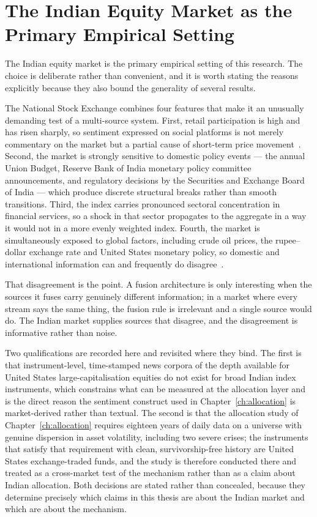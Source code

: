 \section{The Indian Equity Market as the Primary Empirical Setting}

The Indian equity market is the primary empirical setting of this research. The choice is
deliberate rather than convenient, and it is worth stating the reasons explicitly because
they also bound the generality of several results.

The National Stock Exchange combines four features that make it an unusually demanding test
of a multi-source system. First, retail participation is high and has risen sharply, so
sentiment expressed on social platforms is not merely commentary on the market but a
partial cause of short-term price movement~\cite{khan2025asymmetric,mu2023investor}. Second,
the market is strongly sensitive to domestic policy events --- the annual Union Budget,
Reserve Bank of India monetary policy committee announcements, and regulatory decisions by
the Securities and Exchange Board of India --- which produce discrete structural breaks
rather than smooth transitions. Third, the index carries pronounced sectoral concentration
in financial services, so a shock in that sector propagates to the aggregate in a way it
would not in a more evenly weighted index. Fourth, the market is simultaneously exposed to
global factors, including crude oil prices, the rupee--dollar exchange rate and United States
monetary policy, so domestic and international information can and frequently do
disagree~\cite{bacco2024,dong2024}.

That disagreement is the point. A fusion architecture is only interesting when the sources
it fuses carry genuinely different information; in a market where every stream says the same
thing, the fusion rule is irrelevant and a single source would do. The Indian market supplies
sources that disagree, and the disagreement is informative rather than noise.

Two qualifications are recorded here and revisited where they bind. The first is that
instrument-level, time-stamped news corpora of the depth available for United States
large-capitalisation equities do not exist for broad Indian index instruments, which
constrains what can be measured at the allocation layer and is the direct reason the
sentiment construct used in Chapter~\ref{ch:allocation} is market-derived rather than
textual. The second is that the allocation study of Chapter~\ref{ch:allocation} requires
eighteen years of daily data on a universe with genuine dispersion in asset volatility,
including two severe crises; the instruments that satisfy that requirement with clean,
survivorship-free history are United States exchange-traded funds, and the study is
therefore conducted there and treated as a cross-market test of the mechanism rather than as
a claim about Indian allocation. Both decisions are stated rather than concealed, because
they determine precisely which claims in this thesis are about the Indian market and which
are about the mechanism.

